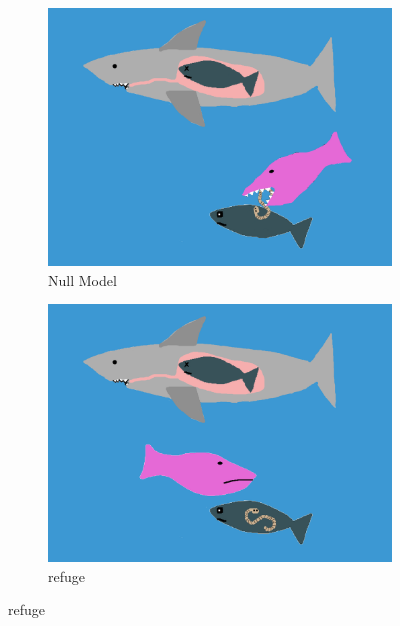\documentclass[11pt]{amsart}
\begin{document}
\begin{figure}
\begin{subfigure}{.45\textwidth}
\caption{Null Model\label{subfig:modelsa}}
\includegraphics[width=\textwidth]{../figures/Null.png}
\end{subfigure}
\begin{subfigure}{.45\textwidth}
\caption{refuge\label{subfig:modelsb}}
\includegraphics[width=\textwidth]{../figures/Null+Ref.png}
\end{subfigure}


\end{figure}
\end{document}
